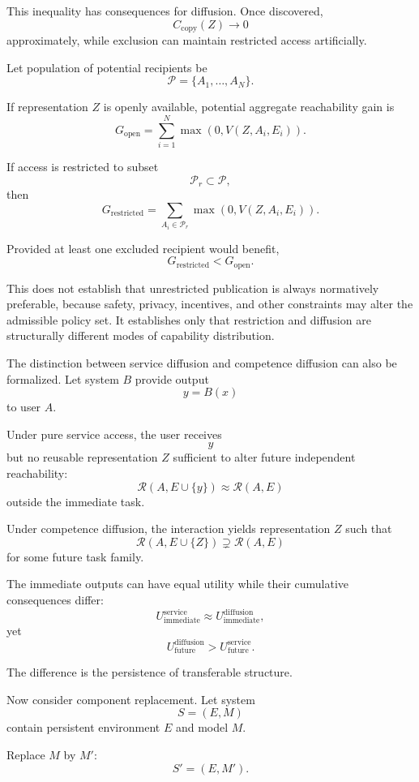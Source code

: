 \documentclass[11pt]{article}
\begin{document}
This inequality has consequences for diffusion. Once discovered,
\[
    C_{\mathrm{copy}}(Z)\rightarrow0
\]
approximately, while exclusion can maintain restricted access artificially.

Let population of potential recipients be
\[
    \mathcal{P}
    =
    \{A_1,\ldots,A_N\}.
\]

If representation \(Z\) is openly available, potential aggregate reachability gain is
\[
    G_{\mathrm{open}}
    =
    \sum_{i=1}^{N}
    \max(0,V(Z,A_i,E_i)).
\]

If access is restricted to subset
\[
    \mathcal{P}_r\subset\mathcal{P},
\]
then
\[
    G_{\mathrm{restricted}}
    =
    \sum_{A_i\in\mathcal{P}_r}
    \max(0,V(Z,A_i,E_i)).
\]

Provided at least one excluded recipient would benefit,
\[
    G_{\mathrm{restricted}}
    <
    G_{\mathrm{open}}.
\]

This does not establish that unrestricted publication is always normatively preferable, because safety, privacy, incentives, and other constraints may alter the admissible policy set. It establishes only that restriction and diffusion are structurally different modes of capability distribution.

The distinction between service diffusion and competence diffusion can also be formalized. Let system \(B\) provide output
\[
    y=B(x)
\]
to user \(A\).

Under pure service access, the user receives
\[
    y
\]
but no reusable representation \(Z\) sufficient to alter future independent reachability:
\[
    \mathcal{R}(A,E\cup\{y\})
    \approx
    \mathcal{R}(A,E)
\]
outside the immediate task.

Under competence diffusion, the interaction yields representation \(Z\) such that
\[
    \mathcal{R}(A,E\cup\{Z\})
    \supsetneq
    \mathcal{R}(A,E)
\]
for some future task family.

The immediate outputs can have equal utility while their cumulative consequences differ:
\[
    U_{\mathrm{immediate}}^{\mathrm{service}}
    \approx
    U_{\mathrm{immediate}}^{\mathrm{diffusion}},
\]
yet
\[
    U_{\mathrm{future}}^{\mathrm{diffusion}}
    >
    U_{\mathrm{future}}^{\mathrm{service}}.
\]

The difference is the persistence of transferable structure.

Now consider component replacement. Let system
\[
    S=(E,M)
\]
contain persistent environment \(E\) and model \(M\).

Replace \(M\) by \(M'\):
\[
    S'=(E,M').
\]
\end{document}
